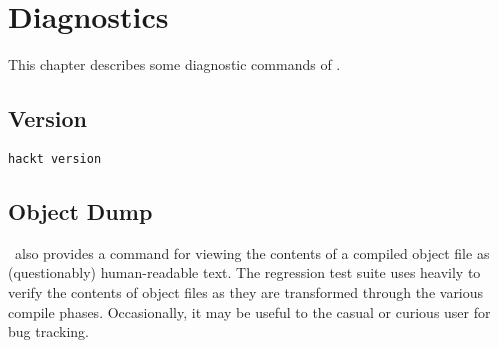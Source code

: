 
\chapter{Diagnostics}
\label{sec:diagnostics}

This chapter describes some diagnostic commands of \binhackt.  

\section{Version}
\label{sec:diagnostics:version}

\begin{verbatim}
hackt version
\end{verbatim}

\section{Object Dump}
\label{sec:diagnostics:objdump}

\binhackt\ also provides a command for viewing the contents of a compiled
object file as (questionably) human-readable text.  
The regression test suite uses  heavily to verify the
contents of object files as they are transformed through the various
compile phases.  
Occasionally, it may be useful to the casual or curious user for 
bug tracking.  

